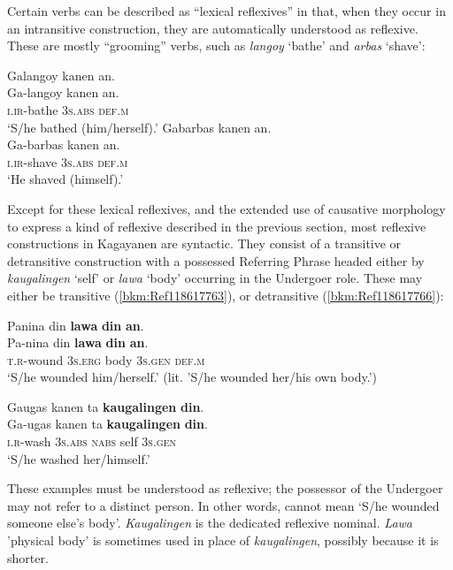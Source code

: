 Certain verbs can be described as “lexical reflexives” in that, when they occur in an intransitive construction, they are automatically understood as reflexive. These are mostly ``grooming” verbs, such as \textit{langoy} ‘bathe’ and \textit{arbas} ‘shave’:

\ea
Galangoy  kanen  an. \\\smallskip
\gll Ga-langoy  kanen  an. \\
\textsc{i.ir}-bathe  3\textsc{s.abs} \textsc{def.m} \\
\glt ‘S/he bathed (him/herself).’
\z
\ea
Gabarbas  kanen  an. \\\smallskip
\gll Ga-barbas  kanen  an. \\
\textsc{i.ir}-shave  3\textsc{s.abs} \textsc{def.m} \\
\glt `He shaved (himself).’
\z

Except for these lexical reflexives, and the extended use of causative morphology to express a kind of reflexive described in the previous section, most reflexive constructions in Kagayanen are syntactic. They consist of a transitive or detransitive construction with a possessed Referring Phrase headed either by \textit{kaugalingen} ‘self’ or  \textit{lawa} ‘body’  occurring in the Undergoer role. These may either be transitive (\ref{bkm:Ref118617763}), or detransitive (\ref{bkm:Ref118617766}):

\ea
\label{bkm:Ref118617763}
Panina  din  \textbf{lawa}  \textbf{din}  \textbf{an}. \\\smallskip
\gll Pa-nina  din  \textbf{lawa}  \textbf{din}  \textbf{an}. \\
\textsc{t.r}-wound  3\textsc{s.erg}  body  3\textsc{s.gen}  \textsc{def.m} \\
\glt ‘S/he wounded him/herself.’ (lit. ’S/he wounded her/his own body.’)
\z

\ea
\label{bkm:Ref118617766}
Gaugas  kanen  ta  \textbf{kaugalingen}  \textbf{din}. \\\smallskip
\gll Ga-ugas  kanen  ta  \textbf{kaugalingen}  \textbf{din}. \\
\textsc{i.r}-wash  3\textsc{s.abs}  \textsc{nabs}  self  3\textsc{s.gen} \\
\glt ‘S/he washed her/himself.’
\z

These examples must be understood as reflexive; the possessor of the Undergoer may not refer to a distinct person. In other words,  cannot mean `S/he wounded someone else's body’. \textit{Kaugalingen} is the dedicated reflexive nominal. \textit{Lawa} ’physical body’ is sometimes used in place of \textit{kaugalingen}, possibly because it is shorter.

